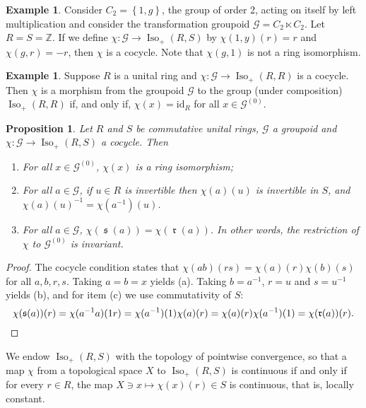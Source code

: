 \documentclass[letter,11pt]{amsart}
\theoremstyle{plain}		\newtheorem{theorem}[generalnumbering]{Theorem}
\theoremstyle{plain}		\newtheorem{corollary}[generalnumbering]{Corollary}
\theoremstyle{definition}		\newtheorem{definition}[generalnumbering]{Definition}
\theoremstyle{definition}		\newtheorem{example}[generalnumbering]{Example}
\theoremstyle{plain}		\newtheorem{proposition}[generalnumbering]{Proposition}
\theoremstyle{plain}		\newtheorem{lemma}[generalnumbering]{Lemma}
\theoremstyle{plain}    \newtheorem{plainstyle}[generalnumbering]{\namefordifferentenvironment}
\theoremstyle{plain}    \newtheorem*{plainstyle*}{\namefordifferentenvironment}
\theoremstyle{definition}    \newtheorem{definitionstyle}[generalnumbering]{\namefordifferentenvironment}
\theoremstyle{definition}    \newtheorem*{definitionstyle*}{\namefordifferentenvironment}
\DeclareMathOperator{\so}{\mathfrak{s}}
\DeclareMathOperator{\ra}{\mathfrak{r}}
\newcommand{\id}{\mathrm{id}}
\begin{document}
\begin{example}
	Consider $C_2=\left\{1,g\right\}$, the group of order 2, acting on itself by left multiplication and consider the transformation groupoid $\mathcal{G}=C_2\ltimes C_2$. Let $R=S=\mathbb{Z}$. If we define $\chi\colon\mathcal{G}\to\operatorname{Iso}_+(R,S)$ by $\chi(1,y)(r)=r$ and $\chi(g,r)=-r$, then $\chi$ is a cocycle. Note that $\chi(g,1)$ is not a ring isomorphism.
\end{example}

\begin{example}
	Suppose $R$ is a unital ring and $\chi\colon\mathcal{G}\to\operatorname{Iso}_+(R,R)$ is a cocycle. Then $\chi$ is a morphism from the groupoid $\mathcal{G}$ to the group (under composition) $\operatorname{Iso}_+(R,R)$ if, and only if, $\chi(x)=\id_R$ for all $x\in \mathcal{G}^{(0)}$.
\end{example}

\begin{proposition}
	Let $R$ and $S$ be commutative unital rings, $\mathcal{G}$ a groupoid and $\chi\colon\mathcal{G}\to\operatorname{Iso}_+(R,S)$ a cocycle. Then
	\begin{enumerate}[label=(\alph*)]
		\item For all $x\in\mathcal{G}^{(0)}$, $\chi(x)$ is a ring isomorphism;
		\item For all $a\in\mathcal{G}$, if $u\in R$ is invertible then $\chi(a)(u)$ is invertible in $S$, and $\chi(a)(u)^{-1}=\chi(a^{-1})(u)$.
		\item For all $a\in\mathcal{G}$, $\chi(\so(a))=\chi(\ra(a))$. In other words, the restriction of $\chi$ to $\mathcal{G}^{(0)}$ is \emph{invariant}.
	\end{enumerate}
\end{proposition}
\begin{proof}
	The cocycle condition states that $\chi(ab)(rs)=\chi(a)(r)\chi(b)(s)$ for all $a,b,r,s$. Taking $a=b=x$ yields (a). Taking $b=a^{-1}$, $r=u$ and $s=u^{-1}$ yields (b), and for item (c) we use commutativity of $S$:
	\[\chi(\so(a))(r)=\chi(a^{-1}a)(1r)=\chi(a^{-1})(1)\chi(a)(r)=\chi(a)(r)\chi(a^{-1})(1)=\chi(\ra(a))(r).\qedhere\]
\end{proof}

We endow $\operatorname{Iso}_+(R,S)$ with the topology of pointwise convergence, so that a map $\chi$ from a topological space $X$ to $\operatorname{Iso}_+(R,S)$ is continuous if and only if for every $r\in R$, the map $X\ni x\mapsto\chi(x)(r)\in S$ is continuous, that is, locally constant.
\end{document}
